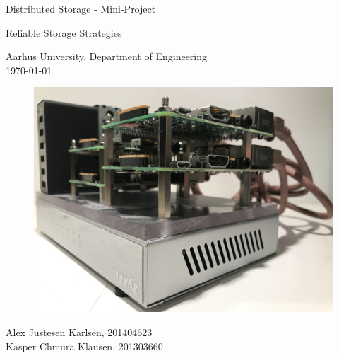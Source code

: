 \begin{titlepage}
    \begin{center}
        {\huge Distributed Storage - Mini-Project} \\ \vspace{10px}

        {\huge Reliable Storage Strategies} \\ \vspace{10px}

        {Aarhus University, Department of Engineering} \\ 
        {\today} \\ \vspace{10px}
        \begin{figure} [H]
            \includegraphics[width=\textwidth]{frontpage/main_image}
        \end{figure}
        {Alex Justesen Karlsen, 201404623} \\
        {Kasper Chmura Klausen, 201303660} \\ \vspace{10px}
    \end{center}
\end{titlepage}